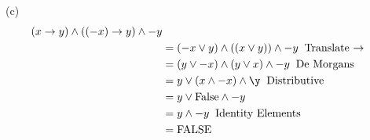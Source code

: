 \documentclass[12pt]{article}
\begin{document}
\vspace{0.25in}
(c) 
\[
\begin{aligned} 
(x \rightarrow y) \wedge ((-x) \rightarrow y) \wedge -y\\
&=  (-x \vee y) \wedge (( x\vee y)) \wedge -y\;\;  \mbox{Translate $\rightarrow$} \\
&= (y \vee -x) \wedge (y\vee x) \wedge -y \;\; \mbox{De Morgans} \\ 
&= y \vee (x \wedge -x) \wedge \y \;\; \mbox{Distributive} \\
&= y \vee \mbox{False} \wedge -y \\
&= y \wedge -y \;\; \mbox{Identity Elements} \\
&= \mbox{FALSE} \\
\end{aligned}
\]
\end{document}
